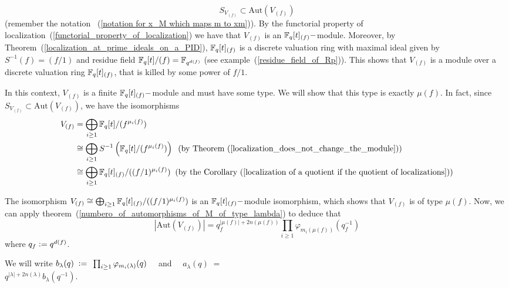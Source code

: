 \begin{equation}
  S_{V_{(f)}}\subset\text{Aut}(V_{(f)})
\end{equation}
(remember the notation ~(\ref{notation for x_M which maps m to xm})). By the functorial property of localization~(\ref{functorial_property_of_localization}) we have that $V_{(f)}$ is an $\mathbb{F}_q[t]_{(f)}-$module. Moreover, by Theorem~(\ref{localization_at_prime_ideals_on_a_PID}), $\mathbb{F}_q[t]_{(f)}$ is a discrete valuation ring with maximal ideal given by $S^{-1}(f)=(f/1)$ and residue field $\mathbb{F}_q[t]/(f)=\mathbb{F}_{q^{d(f)}}$ (see example~(\ref{residue_field_of_Rp})). This shows that $V_{(f)}$ is a module over a discrete valuation ring $\mathbb{F}_q[t]_{(f)}$, that is killed by some power of $f/1$. \par
In this context, $V_{(f)}$ is a finite $\mathbb{F}_q[t]_{(f)}-$module and must have some type. We will show that this type is exactly $\mu(f)$. In fact, since $ S_{V_{(f)}}\subset\text{Aut}(V_{(f)})$, we have the isomorphisms
\begin{equation}
    \begin{split}
         V_{(f)}&=\bigoplus_{i\geq1}\mathbb{F}_q[t]/(f^{\mu_i(f)})\\
         &\cong\bigoplus_{i\geq1} S^{-1}\left(\mathbb{F}_q[t]/(f^{\mu_i(f)})\right)\;\;(\text{by Theorem~(\ref{localization_does_not_change_the_module})})\\
         &\cong\bigoplus_{i\geq1}\mathbb{F}_q[t]_{(f)}/((f/1)^{\mu_i(f)})\;\;(\text{by the Corollary~(\ref{localization of a quotient if the quotient of localizations})})
    \end{split}
\end{equation}\par
The isomorphism $V_{(f)}\cong \bigoplus_{i\geq1}\mathbb{F}_q[t]_{(f)}/((f/1)^{\mu_i(f)})$ is an $\mathbb{F}_q[t]_{(f)}-$module isomorphism, which shows that $V_{(f)}$ is of type $\mu(f)$. Now, we can apply theorem~(\ref{numbero_of_automorphisms_of_M_of_type_lambda}) to deduce that
\begin{equation}\label{number_of_elements_in_Aut(Vg)}
    |\text{Aut}(V_{(f)})|=q_f^{|\mu(f)|+2n(\mu(f))}\prod_{i\geq1}\varphi_{m_i(\mu(f))}(q_f^{-1})
\end{equation}
where $q_f\bydef q^{d(f)}$. 
\begin{dang}
    \begin{notation}
 We \;will\; write $b_\lambda(q)\;\bydef\;\prod_{i\geq1}\varphi_{m_i(\lambda)}(q)\quad$ and $\quad a_\lambda(q)\;=\;\quad$\\
 $q^{|\lambda|+2n(\lambda)}b_\lambda(q^{-1})$.
    \end{notation}
\end{dang}
